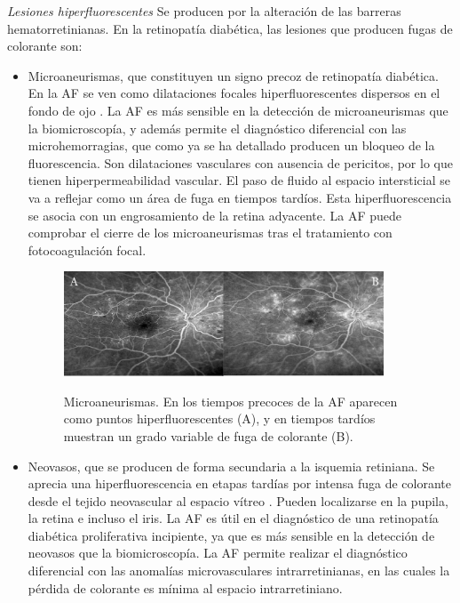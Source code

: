  \textit{Lesiones hiperfluorescentes}
Se producen por la alteración de las barreras hematorretinianas. En la retinopatía diabética, las lesiones que producen fugas de colorante son:
\begin{itemize}
\item Microaneurismas, que constituyen un signo precoz de retinopatía diabética. En la AF se ven como dilataciones focales hiperfluorescentes dispersos en el fondo de ojo . La AF es más sensible en la detección de microaneurismas que la biomicroscopía, y además permite el diagnóstico diferencial con las microhemorragias, que como ya se ha detallado producen un bloqueo de la fluorescencia. Son dilataciones vasculares con ausencia de pericitos, por lo que tienen hiperpermeabilidad vascular. El paso de fluido al espacio intersticial se va a reflejar como un área de fuga en tiempos tardíos. Esta hiperfluorescencia se asocia con un engrosamiento de la retina adyacente. La AF puede comprobar el cierre de los microaneurismas tras el tratamiento con fotocoagulación focal.

\begin{figure}[H]
\centering
\includegraphics[width=0.9\textwidth]{./Figures/AF_HIPERFLUORECINA.png}
\label{fig:lightfilter}
\caption{Microaneurismas. En los tiempos precoces de la AF aparecen como puntos hiperfluorescentes (A), y en tiempos tardíos muestran un grado variable de fuga de colorante (B).}
\end{figure}


\item Neovasos, que se producen de forma secundaria a la isquemia retiniana. Se aprecia una hiperfluorescencia en etapas tardías por
intensa fuga de colorante desde el tejido neovascular al espacio vítreo . Pueden localizarse en la pupila, la retina e incluso
el iris. La AF es útil en el diagnóstico de una retinopatía diabética proliferativa incipiente, ya que es más sensible en la detección de neovasos que la biomicroscopía. La AF permite realizar el diagnóstico diferencial con las anomalías microvasculares intrarretinianas, en las cuales la pérdida de colorante es mínima al espacio intrarretiniano.
\end{itemize}

